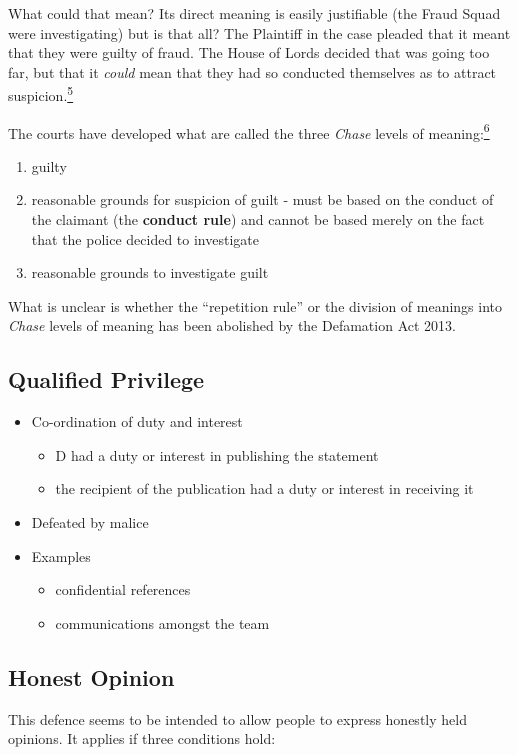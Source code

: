 \documentclass[]{article}
\begin{document}
{{What could that mean? Its direct meaning is easily justifiable (the
Fraud Squad were investigating) but is that all? The Plaintiff in the
case pleaded that it meant that they were guilty of fraud. The House of
Lords decided that was going too far, but that it }}\emph{{could
}}{{mean that they had so conducted themselves as to attract
suspicion.\hyperref[sdfootnote5sym]{\textsuperscript{5}}}}

{{The courts have developed what are called the three }}\emph{{Chase}}{{
levels of meaning:\hyperref[sdfootnote6sym]{\textsuperscript{6}}}}

\begin{enumerate}
\item
  guilty
\item
  {{reasonable grounds for suspicion of guilt - must be based on the
  conduct of the claimant (the }}{\textbf{conduct rule}}{{) and cannot
  be based merely on the fact that the police decided to investigate}}
\item
  reasonable grounds to investigate guilt
\end{enumerate}

What is unclear is whether the ``repetition rule'' or the division of meanings into {\it Chase} levels of meaning has been abolished by the Defamation Act 2013.

\subsection{Qualified Privilege}

\begin{itemize}
\item
  Co-ordination of duty and interest
  \begin{itemize}
  \item
    D had a duty or interest in publishing the statement
  \item
    the recipient of the publication had a duty or interest in receiving it
  \end{itemize}
\item
  Defeated by malice
\item   Examples
  \begin{itemize}
  \item confidential references
  \item communications amongst the team
  \end{itemize}
\end{itemize}

\subsection{Honest Opinion}
This defence seems to be intended to allow people to express honestly held opinions. It applies if three conditions hold:
\end{document}

